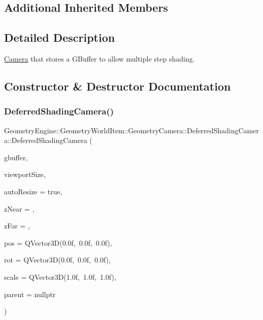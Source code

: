 \subsection*{Additional Inherited Members}


\subsection{Detailed Description}
\mbox{\hyperlink{class_geometry_engine_1_1_geometry_world_item_1_1_geometry_camera_1_1_camera}{Camera}} that stores a G\+Buffer to allow multiple step shading. 

\subsection{Constructor \& Destructor Documentation}
\mbox{\label{class_geometry_engine_1_1_geometry_world_item_1_1_geometry_camera_1_1_deferred_shading_camera_a111a0e1973ca094ef1a09c10e3244db3}} 
\subsubsection{\texorpdfstring{DeferredShadingCamera()}{DeferredShadingCamera()}}
{\footnotesize\ttfamily Geometry\+Engine\+::\+Geometry\+World\+Item\+::\+Geometry\+Camera\+::\+Deferred\+Shading\+Camera\+::\+Deferred\+Shading\+Camera (\begin{DoxyParamCaption}\item[{const \mbox{\hyperlink{class_geometry_engine_1_1_geometry_buffer_1_1_g_buffer}{Geometry\+Buffer\+::\+G\+Buffer}} \&}]{gbuffer,  }\item[{const Q\+Vector4D \&}]{viewport\+Size,  }\item[{bool}]{auto\+Resize = {\ttfamily true},  }\item[{G\+Ldouble}]{z\+Near = {},  }\item[{G\+Ldouble}]{z\+Far = {},  }\item[{const Q\+Vector3D \&}]{pos = {\ttfamily QVector3D(0.0f,~0.0f,~0.0f)},  }\item[{const Q\+Vector3D \&}]{rot = {\ttfamily QVector3D(0.0f,~0.0f,~0.0f)},  }\item[{const Q\+Vector3D \&}]{scale = {\ttfamily QVector3D(1.0f,~1.0f,~1.0f)},  }\item[{\mbox{\hyperlink{class_geometry_engine_1_1_geometry_world_item_1_1_world_item}{World\+Item}} $\ast$}]{parent = {\ttfamily nullptr} }\end{DoxyParamCaption})}

